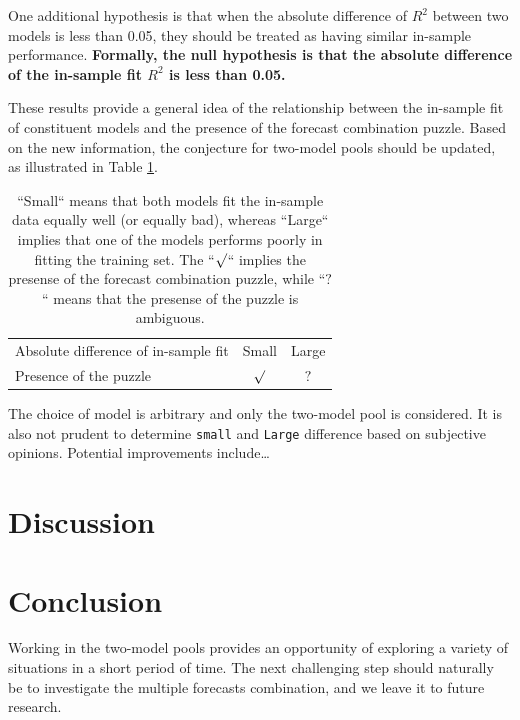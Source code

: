 \documentclass{monashthesis}
\begin{document}
One additional hypothesis is that when the absolute difference of \(R^2\) between two models is less than 0.05, they should be treated as having similar in-sample performance. \textbf{Formally, the null hypothesis is that the absolute difference of the in-sample fit \(R^2\) is less than 0.05.}

These results provide a general idea of the relationship between the in-sample fit of constituent models and the presence of the forecast combination puzzle. Based on the new information, the conjecture for two-model pools should be updated, as illustrated in Table \ref{tab:2}.

\begin{table}[ht]
\centering
\begin{tabular}{lcc}
Absolute difference of in-sample fit    &     Small      &    Large    \\
Presence of the puzzle                  &     $\surd$    &    $?$      \\
\end{tabular}
\caption{``Small`` means that both models fit the in-sample data equally well (or equally bad), whereas ``Large`` implies that one of the models performs poorly in fitting the training set. The ``$\surd$`` implies the presense of the forecast combination puzzle, while ``$?$`` means that the presense of the puzzle is ambiguous.}
\label{tab:2}
\end{table}

The choice of model is arbitrary and only the two-model pool is considered. It is also not prudent to determine \texttt{small} and \texttt{Large} difference based on subjective opinions. Potential improvements include\ldots{}

\hypertarget{discussion}{%
\chapter{Discussion}\label{discussion}}

\hypertarget{conclusion}{%
\chapter{Conclusion}\label{conclusion}}

Working in the two-model pools provides an opportunity of exploring a variety of situations in a short period of time. The next challenging step should naturally be to investigate the multiple forecasts combination, and we leave it to future research.
\end{document}
